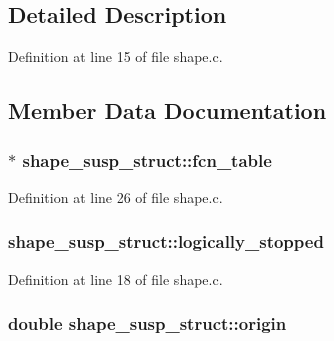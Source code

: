 \subsection{Detailed Description}


Definition at line 15 of file shape.\+c.



\subsection{Member Data Documentation}
\subsubsection[{\texorpdfstring{fcn\+\_\+table}{fcn_table}}]{$\ast$ shape\+\_\+susp\+\_\+struct\+::fcn\+\_\+table}\hypertarget{structshape__susp__struct_a321f17c0b6f71298eacf0aefbbf99516}{}\label{structshape__susp__struct_a321f17c0b6f71298eacf0aefbbf99516}


Definition at line 26 of file shape.\+c.

\subsubsection[{\texorpdfstring{logically\+\_\+stopped}{logically_stopped}}]{ shape\+\_\+susp\+\_\+struct\+::logically\+\_\+stopped}\hypertarget{structshape__susp__struct_a188b8e963460e3f4da70f16eb23e0ba4}{}\label{structshape__susp__struct_a188b8e963460e3f4da70f16eb23e0ba4}


Definition at line 18 of file shape.\+c.

\subsubsection[{\texorpdfstring{origin}{origin}}]{\setlength{\rightskip}{0pt plus 5cm}double shape\+\_\+susp\+\_\+struct\+::origin}\hypertarget{structshape__susp__struct_a9e350865103abe8137ac3d3d44d2f534}{}\label{structshape__susp__struct_a9e350865103abe8137ac3d3d44d2f534}


